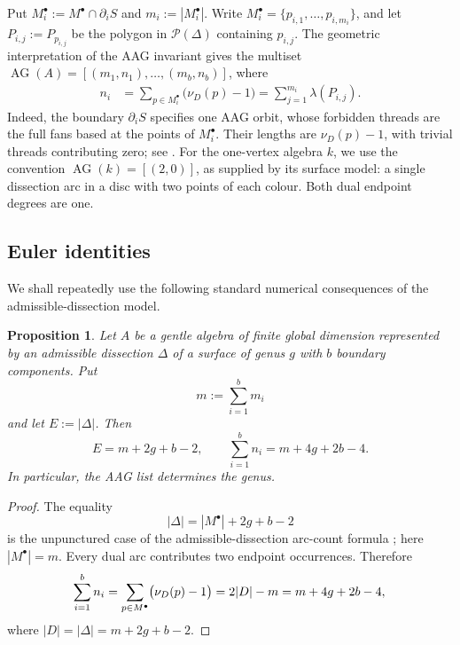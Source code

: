 \documentclass[11pt]{amsart}
\theoremstyle{definition}
\theoremstyle{plain}
\newtheorem{proposition}[proposition]{Proposition}
\theoremstyle{definition}
\theoremstyle{definition}
\newcommand{\AG}{\operatorname{AG}}
\begin{document}
Put $M_i^\bullet:=M^\bullet\cap\partial_iS$ and
$m_i:=|M_i^\bullet|$.  Write
$M_i^\bullet=\{p_{i,1},\ldots,p_{i,m_i}\}$, and let
$P_{i,j}:=P_{p_{i,j}}$ be the polygon in $\mathcal P(\Delta)$ containing
$p_{i,j}$.
The geometric interpretation of the AAG invariant gives
the multiset $\AG(A)=[(m_1,n_1),\ldots,(m_b,n_b)]$, where
\begin{equation}
\label{eq:surface-formulas}
\begin{aligned}
 n_i&=\sum_{p\in M_i^\bullet}\bigl(\nu_D(p)-1\bigr)
     =\sum_{j=1}^{m_i}\lambda(P_{i,j}).
\end{aligned}
\end{equation}
Indeed, the boundary $\partial_iS$ specifies one AAG orbit, whose forbidden
threads are the full fans based at the points of $M_i^\bullet$.
Their lengths are $\nu_D(p)-1$, with trivial threads contributing zero;
see \cite{AvellaAlaminosGeiss,OpperPlamondonSchroll}.
For the one-vertex algebra $k$, we use the convention
$\AG(k)=[(2,0)]$, as supplied by its surface model:
a single dissection arc in a disc with two points of each colour.
Both dual endpoint degrees are one.

\subsection{Euler identities}

We shall repeatedly use the following standard numerical consequences of the
admissible-dissection model.

\begin{proposition}
\label{prop:Euler-identities}
Let $A$ be a gentle algebra of finite global dimension represented by
an admissible dissection $\Delta$ of a surface of genus $g$ with
$b$ boundary components.  Put
\[
 m:=\sum_{i=1}^b m_i
\]
and let $E:=|\Delta|$.  Then
\begin{equation}
\label{eq:Euler-identities}
 E=m+2g+b-2,
 \qquad
 \sum_{i=1}^b n_i=m+4g+2b-4.
\end{equation}
In particular, the AAG list determines the genus.
\end{proposition}

\begin{proof}
The equality
\[
 |\Delta|=|M^{\bullet}|+2g+b-2
\]
is the unpunctured case of the admissible-dissection arc-count formula
\cite[Proposition~3.12]{AmiotPlamondonSchroll}; here
$|M^{\bullet}|=m$.
Every dual arc contributes two endpoint occurrences.  Therefore
\[
 \sum_{i=1}^b n_i
 =\sum_{p\in M^\bullet}\bigl(\nu_D(p)-1\bigr)
 =2|D|-m=m+4g+2b-4,\qedhere
\]
where $|D|=|\Delta|=m+2g+b-2.$
\end{proof}
\end{document}
